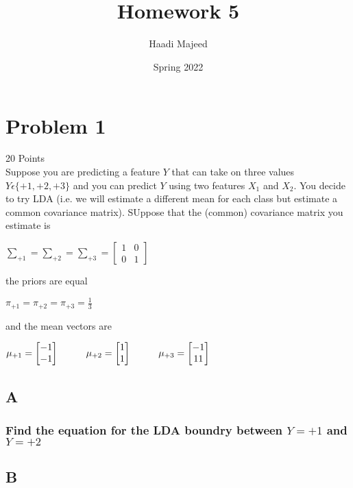 \documentclass[12pt]{article}
\title{ \course \\\large Homework 5 }
\author{ Haadi Majeed }
\date{Spring 2022}
\newcommand\tab[1][1cm]{\hspace*{#1}}
\begin{document}
\maketitle
\pagebreak

\pagebreak
\section{Problem 1}
20 Points\\
Suppose you are predicting a feature $Y$ that can take on three values $Y \epsilon \{+1, +2, +3\}$ and you can predict $Y$ using two features $X_1$ and $X_2$. You decide to try LDA (i.e. we will estimate a different mean for each class but estimate a common covariance matrix). SUppose that the (common) covariance matrix you estimate is
\begin{center}
    $\sum_{+1} = \sum_{+2} = \sum_{+3} = \begin{bmatrix} 1 &0\\0 & 1\end{bmatrix}$
\end{center}
the priors are equal
\begin{center}
    $\pi_{+1} = \pi_{+2} = \pi_{+3} = \frac{1}{3}$
\end{center}
and the mean vectors are
\begin{center}
    $\mu_{+1} = \begin{bmatrix} -1\\-1\end{bmatrix}\tab\mu_{+2} = \begin{bmatrix} 1\\1\end{bmatrix}\tab\mu_{+3} = \begin{bmatrix} -1\\11\end{bmatrix}$
\end{center}

\subsection{A}
\subsubsection{Find the equation for the LDA boundry between $Y = +1$ and $Y = +2$}

\subsection{B}
\end{document}
